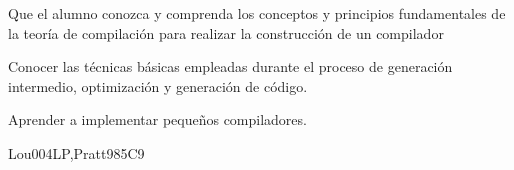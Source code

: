 \begin{syllabus}


\begin{justification}
Que el alumno conozca y comprenda los conceptos y principios fundamentales de la teoría de compilación para realizar la construcción de un compilador
\end{justification}

\begin{goals}
\item Conocer las técnicas básicas empleadas durante el proceso de generación intermedio, optimización y generación de código.
\item Aprender a implementar pequeños compiladores.
\end{goals}

\begin{outcomes}
    \item {}
    \item {}
    \item {}
\end{outcomes}

\begin{competences}
    \item {} 
    \item {} 
\end{competences}

\begin{unit}{\PLProgramRepresentation}{}{Lou004LP,Pratt98}{5}{C9}
\begin{topics}%
	\item \PLProgramRepresentationTopicPrograms
	\item \PLProgramRepresentationTopicAbstract
	\item \PLProgramRepresentationTopicData
	\item \PLRuntimeSystemsTopicJust
	\item \PLRuntimeSystemsTopicOther
\end{topics}

\begin{learningoutcomes}
	\item \PLProgramRepresentationLOExplainHowProcess [\Familiarity]
	\item \PLProgramRepresentationLODescribeAnTree [\Familiarity]
	\item \PLProgramRepresentationLODescribeTheHaving [\Familiarity]
	\item \PLProgramRepresentationLOWriteAProcess [\Familiarity]
	\item \PLRuntimeSystemsLOExplainTheMetadata [\Familiarity]
	\item \PLRuntimeSystemsLODiscussAdvantages [\Familiarity]
	\item \PLRuntimeSystemsLOIdentifyTheBy [\Familiarity]
\end{learningoutcomes}
\end{unit}


\end{syllabus}
